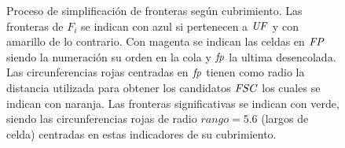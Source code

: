 \begin{figure}[H]

  \caption[Proceso de simplificación de fronteras según cubrimiento.]{Proceso
    de simplificación de fronteras según cubrimiento. Las fronteras de $F_i$ se
    indican con azul si pertenecen a $\mathit{UF}$ y con amarillo de lo contrario.
    Con magenta se indican las celdas en $\mathit{FP}$ siendo la numeración su
    orden en la cola y $\mathit{fp}$ la ultima desencolada. Las
    circunferencias rojas centradas en $\mathit{fp}$ tienen como radio la distancia
    utilizada para obtener los candidatos $\mathit{FSC}$ los cuales se indican con
    naranja. Las fronteras significativas se indican con verde, siendo las
    circunferencias rojas de radio $rango=5.6$ (largos de celda) centradas en estas indicadores de su
  cubrimiento.}\label{fig:ejemploFSCubComp}

\end{figure}

